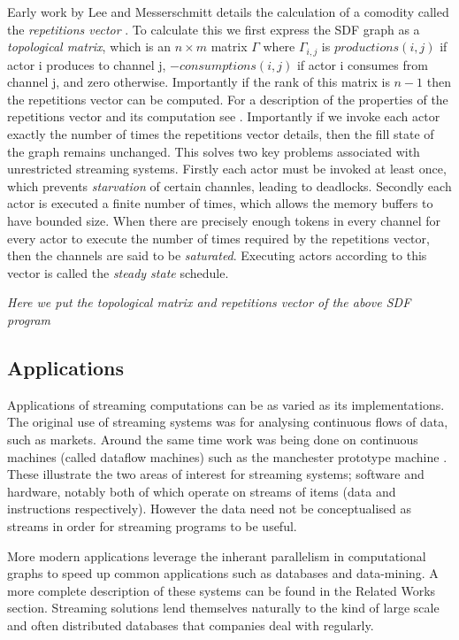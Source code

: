 Early work by Lee and Messerschmitt details the calculation of a comodity called the {\em repetitions vector} \cite{lee87}.
To calculate this we first express the SDF graph as a {\em topological matrix}, which is an $n \times m$ matrix $\Gamma$ where $\Gamma_{i,j}$ is $productions(i, j)$ if actor i produces to channel j, $-consumptions(i, j)$ if actor i consumes from channel j, and zero otherwise.
Importantly if the rank of this matrix is $n-1$ then the repetitions vector can be computed.
For a description of the properties of the repetitions vector and its computation see \cite{sdfBook}.
Importantly if we invoke each actor exactly the number of times the repetitions vector details, then the fill state of the graph remains unchanged.
This solves two key problems associated with unrestricted streaming systems.
Firstly each actor must be invoked at least once, which prevents {\em starvation} of certain channles, leading to deadlocks.
Secondly each actor is executed a finite number of times, which allows the memory buffers to have bounded size.
When there are precisely enough tokens in every channel for every actor to execute the number of times required by the repetitions vector, then the channels are said to be {\em saturated}.
Executing actors according to this vector is called the {\em steady state} schedule.

{\em Here we put the topological matrix and repetitions vector of the above SDF program}

\subsection{Applications}

Applications of streaming computations can be as varied as its implementations.
The original use of streaming systems was for analysing continuous flows of data, such as markets.
Around the same time work was being done on continuous machines (called dataflow machines) such as the manchester prototype machine \cite{gur85}.
These illustrate the two areas of interest for streaming systems; software and hardware, notably both of which operate on streams of items (data and instructions respectively).
However the data need not be conceptualised as streams in order for streaming programs to be useful.

More modern applications leverage the inherant parallelism in computational graphs to speed up common applications such as databases and data-mining.
A more complete description of these systems can be found in the Related Works section.
Streaming solutions lend themselves naturally to the kind of large scale and often distributed databases that companies deal with regularly.

